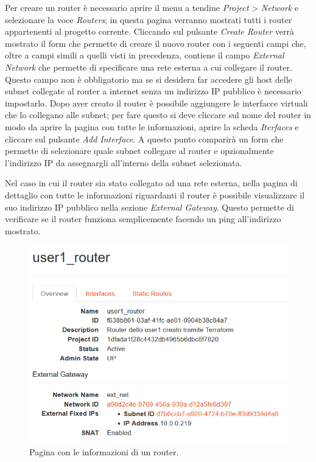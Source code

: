 Per creare un router è necessario aprire il menu a tendine \textit{Project} > \textit{Network} e selezionare la voce \textit{Routers}; in questa pagina verranno mostrati tutti i router appartenenti al progetto corrente. Cliccando sul pulsante \textit{Create Router} verrà mostrato il form che permette di creare il nuovo router con i seguenti campi che, oltre a campi simili a quelli visti in precedenza, contiene il campo \emph{External Network} che permette di specificare una rete esterna a cui collegare il router. Questo campo non è obbligatorio ma se si desidera far accedere gli host delle subnet collegate al router a internet senza un indirizzo IP pubblico è necessario impostarlo.
% 
Dopo aver creato il router è possibile aggiungere le interfacce virtuali che lo collegano alle subnet; per fare questo si deve cliccare sul nome del router in modo da aprire la pagina con tutte le informazioni, aprire la scheda \textit{Iterfaces} e cliccare sul pulsante \textit{Add Interface}. A questo punto comparirà un form che permette di selezionare quale subnet collegare al router e opzionalmente l'indirizzo IP da assegnargli all'interno della subnet selezionata.

Nel caso in cui il router sia stato collegato ad una rete esterna, nella pagina di dettaglio con tutte le informazioni riguardanti il router è possibile visualizzare il suo indirizzo IP pubblico nella sezione \emph{External Gateway}. Questo permette di verificare se il router funziona semplicemente facendo un ping all'indirizzo mostrato.

\begin{figure}[ht]
   \center
   \includegraphics[width=0.9\linewidth]{tesi/files/immagini/openstack_usage/openstack_router_info_2.png}
   \caption{Pagina con le informazioni di un router.}
   \label{fig:openstack_router_info}
\end{figure}

